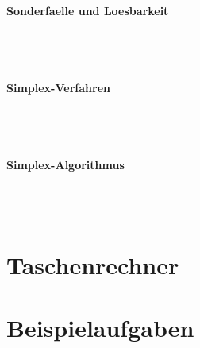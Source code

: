 \documentclass[a4paper]{article} %
\begin{document}
	\paragraph{Sonderfaelle und Loesbarkeit}
	 \hspace{0 cm} \\ \noindent \\
	\paragraph{Simplex-Verfahren}
	 \hspace{0 cm} \\ \noindent \\
	\paragraph{Simplex-Algorithmus}
	 \hspace{0 cm} \\ \noindent \\
	\section{Taschenrechner}
	\section{Beispielaufgaben}


\end{document}
